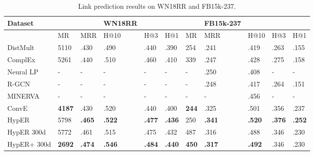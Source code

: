\begin{table}[H]
\caption{Link prediction results on WN18RR and FB15k-237.}
\centering
\begin{tabular}{lllllllllll}
  \textbf{Dataset} & & &  \textbf{WN18RR} & & & & \textbf{FB15k-237} \\
  \hline 
                    	& MR    		& MRR    		& H@10		& H@3    		& H@1    		& MR    		& MRR    		& H@10     	& H@3     		& H@1 \\
  \hline
  DistMult      	& 5110  		& .430      		& .490      		& .440       	& .390     		& 254      		& .241     		& .419        	& .263       	& .155 \\
  ComplEx    	& 5261       	& .440      		& .510     		& .460       	& .410     		& 339        	& .247      		& .428       	& .275       	& .158 \\
  Neural LP   	& -       		& -      		& -      		& -             	& -          		& -        		& .250      		& .408         	& -             	& - \\
  R-GCN       	& -       		& -      		& - 			& -       		& -     		& -        		& .248     		& .417         	& .264       	& .151 \\
  MINERVA        & -       		& -      		& -      		& -       		& -     		& -        		& -      		& .456        	& -       		& - \\
  ConvE        	& \textbf{4187}  & .430   		& .520      		& .440  		& .400  		& \textbf{244}   	& .325  		& .501  		& .356  		& .237 \\
  HypER       	& 5798   		& \textbf{.465}  	& \textbf{.522}  	& \textbf{.477}  	& \textbf{.436}  	& 250   		& \textbf{.341}  	& \textbf{.520}  	& \textbf{.376}  	& \textbf{.252} \\
  \hline
  HypER 300d 	& 5772 		& .461    		& .515      		& .475        	& .432     		& 487      		& .316      		& .488       	& .346        	& .230 \\
  HypER+ 300d	& \textbf{2692} 	& \textbf{.474}  	& \textbf{.546}  	& \textbf{.484}  	&  \textbf{.440} 	& \textbf{450}   	& \textbf{.317}  	& \textbf{.492}  	& .346   		& .230

\end{tabular}
\end{table}


